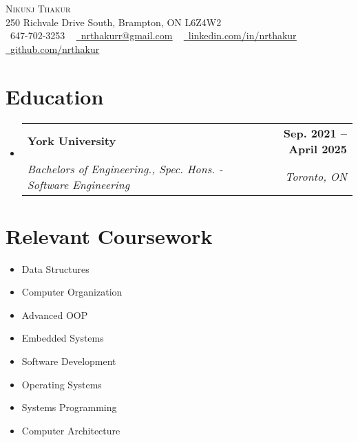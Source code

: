 \documentclass[letterpaper,11pt]{article}
\makeatletter
\newcommand{\resumeSubheading}[4]{
  \vspace{-2pt}\item
    \begin{tabular*}{1.0\textwidth}[t]{l@{\extracolsep{\fill}}r}
      \textbf{#1} & \textbf{\small #2} \\
      \textit{\small#3} & \textit{\small #4} \\
    \end{tabular*}\vspace{-7pt}
}
\newcommand{\resumeSubHeadingListStart}{\begin{itemize}[leftmargin=0.0in, label={}]}
\newcommand{\resumeSubHeadingListEnd}{\end{itemize}}
\makeatother
\begin{document}

\begin{center}
    {\Huge \scshape Nikunj Thakur} \\ \vspace{1pt}
    250 Richvale Drive South, Brampton, ON L6Z4W2 \\ \vspace{1pt}
    \small \raisebox{-0.1\height}\faPhone\ 647-702-3253 ~ \href{mailto:nrthakurr@gmail.com}{\raisebox{-0.2\height}\faEnvelope\  \underline{nrthakurr@gmail.com}} ~ 
    \href{https://www.linkedin.com/in/nrthakur/}{\raisebox{-0.2\height}\faLinkedin\ \underline{linkedin.com/in/nrthakur}}  ~
    \href{https://github.com/nrthakur}{\raisebox{-0.2\height}\faGithub\ \underline{github.com/nrthakur}}
    \vspace{-8pt}
\end{center}


\section{Education}
  \resumeSubHeadingListStart
    \resumeSubheading
      {York University}{Sep. 2021 -- April 2025}
      {Bachelors of Engineering., Spec. Hons. - Software Engineering}{Toronto, ON}
  \resumeSubHeadingListEnd

\section{Relevant Coursework}
        \begin{multicols}{4}
            \begin{itemize}[itemsep=-5pt, parsep=3pt]
                \item\small Data Structures
                \item Computer Organization
                \item Advanced OOP
                \item Embedded Systems
                \item Software Development
                \item Operating Systems
                \item Systems Programming
                \item Computer Architecture
            \end{itemize}
        \end{multicols}
        \vspace*{2.0\multicolsep}
\end{document}
